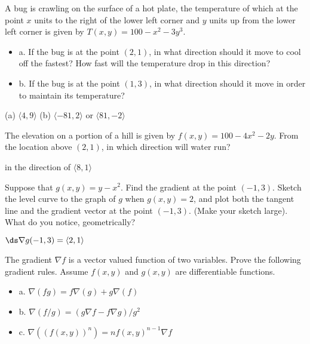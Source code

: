 \begin{exercises}
\exercise A bug is crawling on the surface of a hot plate, the
temperature of which at the point $x$ units to the right of the lower
left corner and $y$ units up from the lower left corner is given by
$T(x,y)=100-x^2-3y^3$.

\begin{itemize} %

\item{a.} If the bug is at the point $(2,1)$, in what direction should it
  move to cool off the fastest?  How fast will the temperature drop in
  this direction?

\item{b.} If the bug is at the point $(1,3)$, in what direction should it
  move in order to maintain its temperature?

\end{itemize}
\begin{answer} (a) $\langle 4,9\rangle$ (b) $\langle -81,2\rangle$ or
$\langle 81,-2\rangle$
\end{answer}

\exercise The elevation on a portion of a hill is given by $f(x,y) =
100 -4x^2 - 2y$.  From the location above $(2,1)$, in which direction will
water run?
\begin{answer} in the direction of $\langle 8,1\rangle$
\end{answer}

\exercise Suppose that $g(x,y)=y-x^2$.  Find the gradient at the point
$(-1, 3)$.  Sketch the level curve to the graph of $g$ when
$g(x,y)=2$, and plot both the tangent line and the gradient vector at
the point $(-1,3)$. (Make your sketch large).  What do you notice,
geometrically?
\begin{answer} $\ds \nabla g(-1,3)=\langle 2,1\rangle$
\end{answer}

\exercise The gradient $\nabla f$ is a vector
valued function of two variables.  Prove the following gradient rules.
Assume $f(x,y)$ and $g(x,y)$ are differentiable functions.

\begin{itemize} %
\item{a.} $\nabla(fg)=f\nabla(g)+g\nabla(f)$
\item{b.} $\nabla(f/g)=(g\nabla f - f \nabla g)/g^2$
\item{c.} $\nabla((f(x,y))^n)=nf(x,y)^{n-1}\nabla f$
\end{itemize}

\end{exercises}
